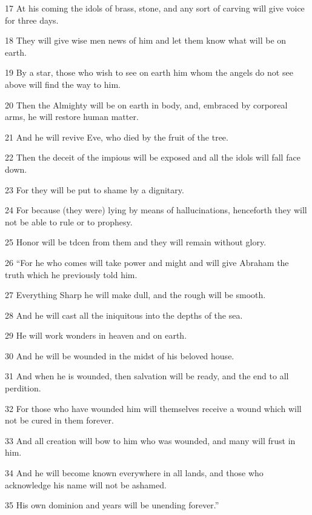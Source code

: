 \par 17 At his coming the idols of brass, stone, and any sort of carving will give voice for three days.

\par 18 They will give wise men news of him and let them know what will be on earth.

\par 19 By a star, those who wish to see on earth him whom the angels do not see above will find the way to him. 

\par 20 Then the Almighty will be on earth in body, and, embraced by corporeal arms, he will restore human matter. 

\par 21 And he will revive Eve, who died by the fruit of the tree. 

\par 22 Then the deceit of the impious will be exposed and all the idols will fall face down. 

\par 23 For they will be put to shame by a dignitary. 

\par 24 For because (they were) lying by means of hallucinations, henceforth they will not be able to rule or to prophesy. 

\par 25 Honor will be tdcen from them and they will remain without glory.

\par 26 “For he who comes will take power and might and will give Abraham the truth which he previously told him. 

\par 27 Everything Sharp he will make dull, and the rough will be smooth. 

\par 28 And he will cast all the iniquitous into the depths of the sea. 

\par 29 He will work wonders in heaven and on earth. 

\par 30 And he will be wounded in the midst of his beloved house.

\par 31 And when he is wounded, then salvation will be ready, and the end to all perdition. 

\par 32 For those who have wounded him will themselves receive a wound which will not be cured in them forever. 

\par 33 And all creation will bow to him who was wounded, and many will frust in him. 

\par 34 And he will become known everywhere in all lands, and those who acknowledge his name will not be ashamed. 

\par 35 His own dominion and years will be unending forever.”

